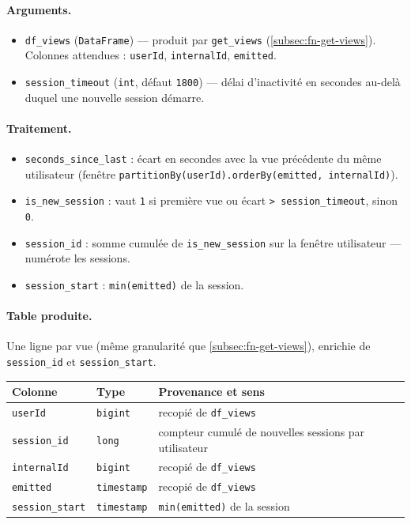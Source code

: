 \documentclass[11pt,a4paper]{article}
\newcommand{\code}[1]{\texttt{\small #1}}
\begin{document}
\paragraph{Arguments.}
\begin{itemize}[nosep,leftmargin=*]
  \item \code{df\_views} (\code{DataFrame}) --- produit par \code{get\_views}
        (\ref{subsec:fn-get-views}). Colonnes attendues : \code{userId},
        \code{internalId}, \code{emitted}.
  \item \code{session\_timeout} (\code{int}, défaut \code{1800}) --- délai
        d'inactivité en secondes au-delà duquel une nouvelle session démarre.
\end{itemize}

\paragraph{Traitement.}
\begin{itemize}[nosep,leftmargin=*]
  \item \code{seconds\_since\_last} : écart en secondes avec la vue précédente du
        même utilisateur (fenêtre \code{partitionBy(userId).orderBy(emitted,
        internalId)}).
  \item \code{is\_new\_session} : vaut \code{1} si première vue ou écart
        \code{> session\_timeout}, sinon \code{0}.
  \item \code{session\_id} : somme cumulée de \code{is\_new\_session} sur la
        fenêtre utilisateur --- numérote les sessions.
  \item \code{session\_start} : \code{min(emitted)} de la session.
\end{itemize}

\paragraph{Table produite.}
Une ligne par vue (même granularité que \ref{subsec:fn-get-views}), enrichie de
\code{session\_id} et \code{session\_start}.
\begin{center}
\small
\begin{tabular}{@{}llp{6.8cm}@{}}
\toprule
\textbf{Colonne} & \textbf{Type} & \textbf{Provenance et sens} \\
\midrule
\code{userId} & \code{bigint} & recopié de \code{df\_views} \\
\code{session\_id} & \code{long} & compteur cumulé de nouvelles sessions par utilisateur \\
\code{internalId} & \code{bigint} & recopié de \code{df\_views} \\
\code{emitted} & \code{timestamp} & recopié de \code{df\_views} \\
\code{session\_start} & \code{timestamp} & \code{min(emitted)} de la session \\
\bottomrule
\end{tabular}
\end{center}
\end{document}
